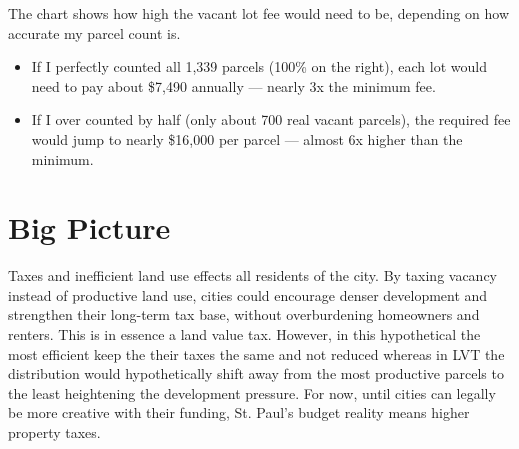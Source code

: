 \documentclass[12pt]{article}
\begin{document}
The chart shows how high the vacant lot fee would need to be, depending on how accurate my parcel count is.  

\begin{itemize}
    \item If I perfectly counted all 1,339 parcels (100\% on the right), each lot would need to pay about \$7,490 annually — nearly 3x the minimum fee.
    \item If I over counted by half (only about 700 real vacant parcels), the required fee would jump to nearly \$16,000 per parcel — almost 6x higher than the minimum.
\end{itemize}

\section*{Big Picture}

Taxes and inefficient land use effects all residents of the city. By taxing vacancy instead of productive land use, cities could encourage denser development and strengthen their long-term tax base, without overburdening homeowners and renters. This is in essence a land value tax. However, in this hypothetical the most efficient keep the their taxes the same and not reduced whereas in LVT the distribution would hypothetically shift away from the most productive parcels to the least heightening the development pressure. For now, until cities can legally be more creative with their funding, St. Paul’s budget reality means higher property taxes. 
\end{document}
